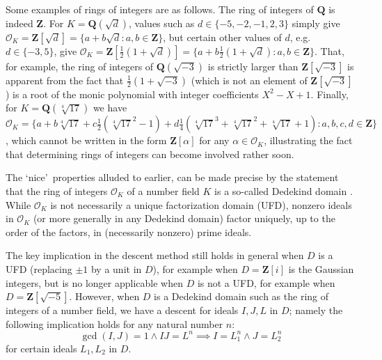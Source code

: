 \documentclass[sigplan,10pt,nonacm,
screen]{acmart} \settopmatter{printfolios=true,printccs=false,printacmref=false}
\newcommand{\QQ}{\mathbf{Q}}
\newcommand{\ZZ}{\mathbf{Z}}
\newcommand{\OK}{\mathcal{O}_K}
\begin{document}
Some examples of rings of integers are as follows.
The ring of integers of $\QQ$ is indeed $\ZZ$.
For $K= \QQ(\sqrt{d})$, values such as $d \in \{-5,-2,-1,2,3\}$ simply give $\OK=\ZZ[\sqrt{d}]=\{a+b \sqrt{d} : a,b \in \ZZ \}$,
but certain other values of $d$, e.g. $d \in \{-3,5\}$, give $\OK=\ZZ[\frac{1}{2}(1+\sqrt{d})]=\{a+b \frac{1}{2}(1+\sqrt{d}) : a,b \in \ZZ \}$.
That, for example, the ring of integers of $\QQ(\sqrt{-3})$ is strictly larger than $\ZZ[\sqrt{-3}]$ is apparent from the fact that $\frac{1}{2}(1+\sqrt{-3})$
(which is not an element of $\ZZ[\sqrt{-3}]$) is a root of the monic polynomial with integer coefficients $X^2-X+1$.
Finally, for $K=\QQ(\sqrt[4]{17})$ we have $\OK=\{a+b\sqrt[4]{17}+c\frac{1}{2}(\sqrt[4]{17}^2-1)+d \frac{1}{4}(\sqrt[4]{17}^3+\sqrt[4]{17}^2+\sqrt[4]{17}+1) : a,b,c,d \in \ZZ \}$, which cannot be written in the form $\ZZ[\alpha]$ for any $\alpha \in \OK$, illustrating the fact that determining rings of integers can become involved rather soon.

The \lq nice\rq\ properties alluded to earlier, can be made precise by the statement that the ring of integers $\OK$ of a number field $K$ is a so-called Dedekind domain \cite[Section 2]{baanen_formalization_2021}. While $\OK$ is not necessarily a unique factorization domain (UFD), nonzero ideals in $\OK$
(or more generally in any Dede\-kind domain) %
factor uniquely, up to the order of the factors, in (necessarily nonzero) prime ideals.

The key implication in the descent method still holds in general when $D$ is a UFD (replacing $\pm 1$ by a unit in $D$), for example when $D=\ZZ[i]$ is the Gaussian integers,
but is no longer applicable when $D$ is not a UFD, for example when $D=\ZZ[\sqrt{-5}]$.
However, when $D$ is a Dedekind domain such as the ring of integers of a number field,
we have a descent for ideals $I, J, L$ in $D$; namely the following implication holds for any natural number $n$:
\begin{equation}\label{eqn:Ideal_descent}
  \gcd(I,J)=1 \wedge I J=L^n \implies I=L_1^n \wedge J=L_2^n
\end{equation}
for certain ideals $L_1, L_2$ in $D$.
\end{document}
